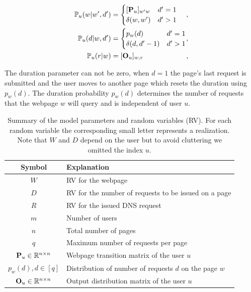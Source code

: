 \documentclass[conference]{IEEEtran}
\begin{document}
	
	
	\begin{equation}
	\label{eq:probs}
	\begin{alignedat}{3}
	\pr_u(w | w', d') &= 
	\begin{cases} 
	[\bP_u]_{w'w} & d' = 1  \\
	\delta(w, w') & d' > 1
	\end{cases} &,&
	\\ 
	\pr_u(d | w, d') &= 
	\begin{cases} 
	p_{w}(d) & d' = 1 \\
	\delta(d, d'-1) & d' > 1
	\end{cases} &,&
	\\   
	\pr_u(r|w) &= [\O_{u}]_{w, r}&,&	
	\end{alignedat} 
	\end{equation}
	
	The duration parameter can not be zero, when $d = 1$ the page's last request is submitted and the user moves to another page which resets the duration using $p_w(d)$. 
	The duration probability $p_w(d)$ determines the number of requests that the webpage $w$ will query and is independent of user $u$. 
	
	\begin{table}
		\centering
		\begin{tabular}{|c|l}
			\hline
			Symbol & Explanation \\ 
			\hline 
			$W$ & RV for the webpage \\ \hline
			$D$ & RV for the number of requests to be issued on a page \\ \hline
			$R$ & RV for the issued DNS request \\ \hline
			\hline 
			$m$ & Number of users \\ \hline
			$n$ & Total number of pages \\ \hline
			$q$ & Maximum number of requests per page \\ \hline 
			\hline 
			$\mathbf{P}_u \in \mathbb R^{n \times n}$ & Webpage transition matrix of the user $u$ \\ \hline 
			$p_w(d), d \in [q]$ & Distribution of number of requests $d$ on the page $w$ \\ \hline 
			$\mathbf{O}_u \in \mathbb R^{n \times n}$ & Output distribution matrix of the user $u$  \\ \hline
		\end{tabular}
		\caption{Summary of the model parameters and random variables (RV). For each random variable the corresponding small letter represents a realization. Note that $W$ and $D$ depend on the user but to avoid cluttering we omitted the index $u$.}
		\label{tab:params}
	\end{table}
	
\end{document}
